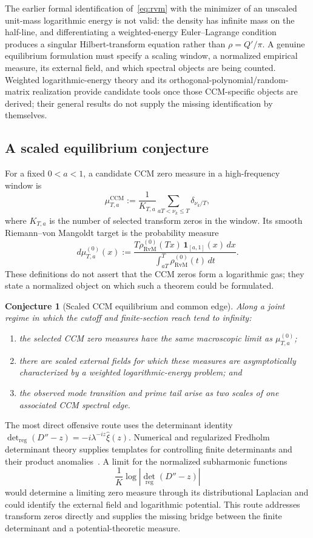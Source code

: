\documentclass[11pt,a4paper]{article}
\newtheorem{conjecture}{Conjecture}
\begin{document}
The earlier formal identification of~\eqref{eq:rvm} with the minimizer of an
unscaled unit-mass logarithmic energy is not valid: the density has infinite
mass on the half-line, and differentiating a weighted-energy Euler--Lagrange
condition produces a singular Hilbert-transform equation rather than
$\rho=Q'/\pi$. A genuine equilibrium formulation must specify a scaling
window, a normalized empirical measure, its external field, and which spectral
objects are being counted. Weighted logarithmic-energy theory
\cite{SaffTotik1997} and its orthogonal-polynomial/random-matrix realization
\cite{Deift1999} provide candidate tools once those CCM-specific objects are
derived; their general results do not supply the missing identification by
themselves.

\subsection{A scaled equilibrium conjecture}\label{ssec:eqconjecture}

For a fixed $0<a<1$, a candidate CCM zero measure in a high-frequency window is
\[
 \mu_{T,a}^{\mathrm{CCM}}
 :=\frac{1}{K_{T,a}}
   \sum_{aT<\nu_k\le T}\delta_{\nu_k/T},
\]
where $K_{T,a}$ is the number of selected transform zeros in the window. Its
smooth Riemann--von Mangoldt target is the probability measure
\[
 d\mu_{T,a}^{(0)}(x)
 :=\frac{T\rho_{\mathrm{RvM}}^{(0)}(Tx)\,\mathbf1_{[a,1]}(x)\,dx}
 {\int_{aT}^{T}\rho_{\mathrm{RvM}}^{(0)}(t)\,dt}.
\]
These definitions do not assert that the CCM zeros form a logarithmic gas;
they state a normalized object on which such a theorem could be formulated.

\begin{conjecture}[Scaled CCM equilibrium and common edge]
Along a joint regime in which the cutoff and finite-section reach tend to
infinity:
\begin{enumerate}
\item[(i)] the selected CCM zero measures have the same macroscopic limit as
  $\mu_{T,a}^{(0)}$;
\item[(ii)] there are scaled external fields for which these measures are
  asymptotically characterized by a weighted logarithmic-energy problem; and
\item[(iii)] the observed mode transition and prime tail arise as two scales of
  one associated CCM spectral edge.
\end{enumerate}
\end{conjecture}

The most direct offensive route uses the determinant identity
$\det_{\mathrm{reg}}(D''-z)=-i\lambda^{-iz}\widehat\xi(z)$. Numerical and
regularized Fredholm determinant theory supplies templates for controlling
finite determinants and their product anomalies~\cite{Bornemann2008,GalloZweckLatushkin2025,BritzEtAl2020}. A limit for the
normalized subharmonic functions
\[
 \frac{1}{K}\log\left|\det_{\mathrm{reg}}(D''-z)\right|
\]
would determine a limiting zero measure through its distributional Laplacian
and could identify the external field and logarithmic potential. This route
addresses transform zeros directly and supplies the missing bridge between the
finite determinant and a potential-theoretic measure.
\end{document}
